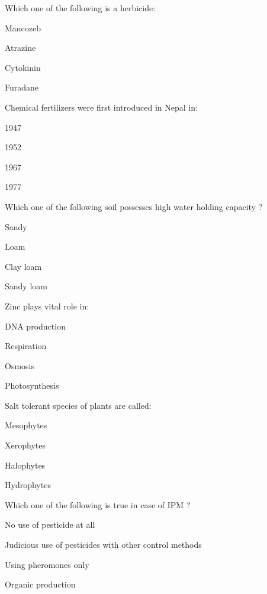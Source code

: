 \begin{questions}
\question Which one of the following is a herbicide:
  \begin{items}
  \item Mancozeb
  \item Atrazine
  \item Cytokinin
  \item Furadane
  \end{items}

\question Chemical fertilizers were first introduced in Nepal in:
  \begin{items}
  \item 1947
  \item 1952
  \item 1967
  \item 1977
  \end{items}

\question Which one of the following soil possesses high water holding capacity ?
  \begin{items}
  \item Sandy
  \item Loam
  \item Clay loam
  \item Sandy loam
  \end{items}

\question Zinc plays vital role in:
  \begin{items}
  \item DNA production
  \item Respiration
  \item Osmosis
  \item Photosynthesis
  \end{items}

\question Salt tolerant species of plants are called:
  \begin{items}
  \item Mesophytes
  \item Xerophytes
  \item Halophytes
  \item Hydrophytes
  \end{items}

\question Which one of the following is true in case of IPM ?
  \begin{items}
  \item No use of pesticide at all
  \item Judicious use of pesticides with other control methods
  \item Using pheromones only
  \item Organic production
  \end{items}


\end{questions}
